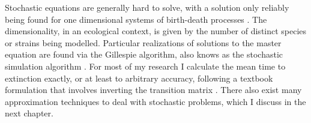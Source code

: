 

Stochastic equations are generally hard to solve, with a solution only reliably being found for one dimensional systems of birth-death processes \cite{Nisbet1982,Gardiner2004a,others???}. %
The dimensionality, in an ecological context, is given by the number of distinct species or strains being modelled. 
Particular realizations of solutions to the master equation are found via the Gillespie algorithm, also knows as the stochastic simulation algorithm \cite{Gillespie1977,Cao2006}. 
For most of my research I calculate the mean time to extinction exactly, or at least to arbitrary accuracy, following a textbook formulation that involves inverting the transition matrix \cite{Nisbet1982,Norden1982,Parsons2007,Parsons2010}. 
There also exist many approximation techniques to deal with stochastic problems, which I discuss in the next chapter. 

